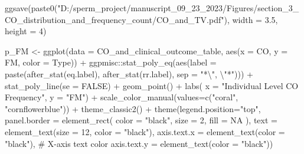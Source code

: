 \documentclass[
  letterpaper,
  DIV=11,
  numbers=noendperiod]{scrreprt}
\newenvironment{Shaded}{\begin{snugshade}}{\end{snugshade}}
\newcommand{\AttributeTok}[1]{\textcolor[rgb]{0.40,0.45,0.13}{#1}}
\newcommand{\CommentTok}[1]{\textcolor[rgb]{0.37,0.37,0.37}{#1}}
\newcommand{\ConstantTok}[1]{\textcolor[rgb]{0.56,0.35,0.01}{#1}}
\newcommand{\DecValTok}[1]{\textcolor[rgb]{0.68,0.00,0.00}{#1}}
\newcommand{\FloatTok}[1]{\textcolor[rgb]{0.68,0.00,0.00}{#1}}
\newcommand{\FunctionTok}[1]{\textcolor[rgb]{0.28,0.35,0.67}{#1}}
\newcommand{\NormalTok}[1]{\textcolor[rgb]{0.00,0.23,0.31}{#1}}
\newcommand{\OtherTok}[1]{\textcolor[rgb]{0.00,0.23,0.31}{#1}}
\newcommand{\SpecialCharTok}[1]{\textcolor[rgb]{0.37,0.37,0.37}{#1}}
\newcommand{\StringTok}[1]{\textcolor[rgb]{0.13,0.47,0.30}{#1}}
\begin{document}
\begin{codelisting}
\begin{Shaded}
\begin{Highlighting}[]
\FunctionTok{ggsave}\NormalTok{(}\FunctionTok{paste0}\NormalTok{(}\StringTok{"D:/sperm\_project/manuscript\_09\_23\_2023/Figures/section\_3\_CO\_distribution\_and\_frequency\_count/CO\_and\_TV.pdf"}\NormalTok{), }\AttributeTok{width =} \FloatTok{3.5}\NormalTok{, }\AttributeTok{height =} \DecValTok{4}\NormalTok{)  }

\NormalTok{p\_FM }\OtherTok{\textless{}{-}} \FunctionTok{ggplot}\NormalTok{(}\AttributeTok{data =}\NormalTok{ CO\_and\_clinical\_outcome\_table, }\FunctionTok{aes}\NormalTok{(}\AttributeTok{x =}\NormalTok{ CO, }\AttributeTok{y =}\NormalTok{ FM, }\AttributeTok{color =}\NormalTok{ Type)) }\SpecialCharTok{+}
\NormalTok{  ggpmisc}\SpecialCharTok{::}\FunctionTok{stat\_poly\_eq}\NormalTok{(}\FunctionTok{aes}\NormalTok{(}\AttributeTok{label =} \FunctionTok{paste}\NormalTok{(}\FunctionTok{after\_stat}\NormalTok{(eq.label),}
                               \FunctionTok{after\_stat}\NormalTok{(rr.label), }\AttributeTok{sep =} \StringTok{"*}\SpecialCharTok{\textbackslash{}"}\StringTok{, }\SpecialCharTok{\textbackslash{}"}\StringTok{*"}\NormalTok{))) }\SpecialCharTok{+}
  \FunctionTok{stat\_poly\_line}\NormalTok{(}\AttributeTok{se =} \ConstantTok{FALSE}\NormalTok{) }\SpecialCharTok{+}
  \FunctionTok{geom\_point}\NormalTok{() }\SpecialCharTok{+} 
  \FunctionTok{labs}\NormalTok{(}
       \AttributeTok{x =} \StringTok{"Individual Level CO Frequency"}\NormalTok{,}
       \AttributeTok{y =} \StringTok{"FM"}\NormalTok{) }\SpecialCharTok{+}
  \FunctionTok{scale\_color\_manual}\NormalTok{(}\AttributeTok{values=}\FunctionTok{c}\NormalTok{(}\StringTok{"coral"}\NormalTok{, }\StringTok{"cornflowerblue"}\NormalTok{)) }\SpecialCharTok{+} \FunctionTok{theme\_classic2}\NormalTok{() }\SpecialCharTok{+}
  \FunctionTok{theme}\NormalTok{(}\AttributeTok{legend.position=}\StringTok{"top"}\NormalTok{,}
        \AttributeTok{panel.border =} \FunctionTok{element\_rect}\NormalTok{(}
          \AttributeTok{color =} \StringTok{"black"}\NormalTok{,}
          \AttributeTok{size =} \DecValTok{2}\NormalTok{,}
          \AttributeTok{fill =} \ConstantTok{NA}
\NormalTok{          ),}
        \AttributeTok{text =} \FunctionTok{element\_text}\NormalTok{(}\AttributeTok{size =} \DecValTok{12}\NormalTok{, }\AttributeTok{color =} \StringTok{"black"}\NormalTok{),}
        \AttributeTok{axis.text.x =} \FunctionTok{element\_text}\NormalTok{(}\AttributeTok{color =} \StringTok{"black"}\NormalTok{),  }\CommentTok{\# X{-}axis text color}
        \AttributeTok{axis.text.y =} \FunctionTok{element\_text}\NormalTok{(}\AttributeTok{color =} \StringTok{"black"}\NormalTok{))}


\end{Highlighting}
\end{Shaded}
\end{codelisting}
\end{document}
